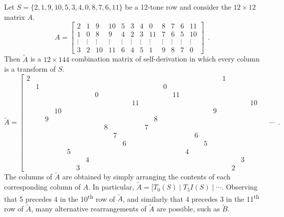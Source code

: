 \begin{example}
	\label{ex:westergaard}
	\cite[102]{Westergaard1966}
	Let $S = \{ 2, 1, 9, 10, 5, 3, 4, 0, 8, 7, 6, 11 \}$ be a 12-tone row and consider the $12 \times 12$ matrix $A$.
	\begin{equation}
    	A = \left[
    	\begin{array}{cccccccccccc}
        	2 & 1 & 9 & 10 & 5 & 3 & 4 & 0 & 8 & 7 & 6 & 11 \\
        	1 & 0 & 8 & 9 & 4 & 2 & 3 & 11 & 7 & 6 & 5 & 10 \\
        	\vdots & \vdots & \vdots & \vdots & \vdots & \vdots & \vdots & \vdots & \vdots & \vdots & \vdots & \vdots \\
        	3 & 2 & 10 & 11 & 6 & 4 & 5 & 1 & 9 & 8 & 7 & 0
    	\end{array}
    	\right] \enspace.
	\end{equation}
	Then $\tilde{A}$ is a $12 \times 144$ combination matrix of self-derivation in which every column is a transform of $S$.
	\begin{equation}
    	\tilde{A} = \left[
    	\begin{array}{cccccccccccc|cccccccccccc|}
        	2 &&&&&&&&&&&    &  &&&&&&&& 1 &&& \\
        	& 1 &&&&&&&&&&   &  && 0 &&&&&&&&& \\
        	&&&&&&& 0 &&&&   &  &&& 11 &&&&&&&& \\
        	&&&&&&&&&&& 11   &  &&&&&&&&&&& 10 \\
        	&&& 10 &&&&&&&&  &  &&&&&&& 9 &&&& \\
        	&& 9 &&&&&&&&&   &  & 8 &&&&&&&&&& \\
        	&&&&&&&& 8 &&&   &  7 &&&&&&&&&&& \\
        	&&&&&&&&& 7 &&   &  &&&&& 6 &&&&&& \\
        	&&&&&&&&&& 6 &   &  &&&&&& 5 &&&&& \\
        	&&&& 5 &&&&&&&   &  &&&& 4 &&&&&&& \\
        	&&&&&& 4 &&&&&   &  &&&&&&&&&& 3 & \\
        	&&&&& 3 &&&&&&   &  &&&&&&&&& 2 &&
    	\end{array}
    	\; \quad \cdots \right. \enspace.
	\end{equation}
	The columns of $\tilde{A}$ are obtained by simply arranging the contents of each corresponding column of $A$. In particular, $\tilde{A} = [T_0(S) \; | \; T_5I(S) \; | \; \cdots$. Observing that 5 precedes 4 in the 10\textsuperscript{th} row of $\tilde{A}$, and similarly that 4 precedes 3 in the 11\textsuperscript{th} row of $\tilde{A}$, many alternative rearrangements of $\tilde{A}$ are possible, such as $\tilde{B}$.

\end{example}
